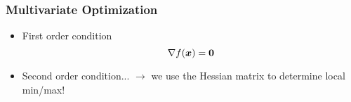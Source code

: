 \documentclass[pdflatex, 12pt]{beamer}
\begin{document}

\begin{frame}
\frametitle{Multivariate Optimization}
\begin{itemize}
\item First order condition
 \begin{equation}
 \nabla f(\bm{x}) = \bm{0} \notag
 \end{equation}
\vspace{0.2cm}
\item Second order condition... $\rightarrow$ we use the Hessian matrix to determine local min/max!
\end{itemize}
\end{frame}
\end{document}
